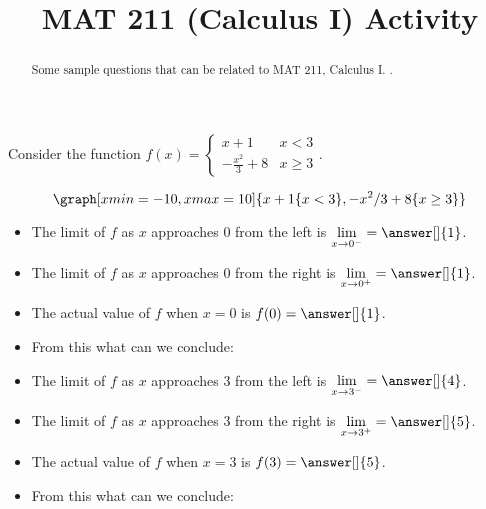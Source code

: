 \documentclass{ximera}
\title{MAT 211 (Calculus I) Activity}
\begin{document}
      
\begin{abstract}
      
Some sample questions that can be related to MAT 211, Calculus I.
.
      
\end{abstract}
      
\maketitle
      
      
\begin{question}      
Consider the function $f(x)=\begin{cases}x+1 & x<3 \\ -\frac{x^2}{3}+8 & x\geq 3\end{cases}$.

\begin{onlineOnly}
$$\graph[xmin=-10,xmax=10]{x+1\{x<3\},-x^2/3+8\{x\geq 3\}}$$
\end{onlineOnly}


\begin{itemize}
\item The limit of $f$ as $x$ approaches 0 from the left is $\displaystyle\lim_{x\to 0^-}=\answer[]{1}$.
\item The limit of $f$ as $x$ approaches 0 from the right is $\displaystyle\lim_{x\to 0^+}=\answer[]{1}$.
\item The actual value of $f$ when $x=0$ is $f(0)=\answer[]{1}$.
\item From this what can we conclude:
\begin{multipleChoice}
\end{multipleChoice}
\item The limit of $f$ as $x$ approaches 3 from the left is $\displaystyle\lim_{x\to 3^-}=\answer[]{4}$.
\item The limit of $f$ as $x$ approaches 3 from the right is $\displaystyle\lim_{x\to 3^+}=\answer[]{5}$.
\item The actual value of $f$ when $x=3$ is $f(3)=\answer[]{5}$.
\item From this what can we conclude:
\begin{multipleChoice}
\end{multipleChoice}

\end{itemize}


\end{question}
\end{document}
